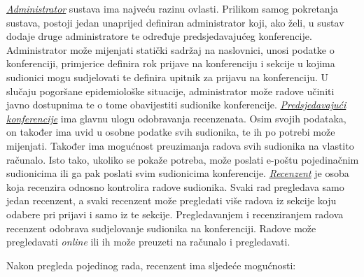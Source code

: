 		\underline{\textit{Administrator}} sustava ima najveću razinu ovlasti. Prilikom samog pokretanja sustava, postoji jedan unaprijed definiran administrator koji, ako želi, u sustav dodaje druge administratore te određuje predsjedavajućeg konferencije. Administrator može mijenjati statički sadržaj na naslovnici, unosi podatke o konferenciji, primjerice definira rok prijave na konferenciju i sekcije u kojima sudionici mogu sudjelovati te definira upitnik za prijavu na konferenciju. U slučaju pogoršane epidemiološke situacije, administrator može radove učiniti javno dostupnima te o tome obavijestiti sudionike konferencije.
		\newline
		\newline
		\indent \underline{\textit{Predsjedavajući konferencije}} ima glavnu ulogu odobravanja recenzenata. Osim svojih podataka, on također ima uvid u osobne podatke svih sudionika, te ih po potrebi može mijenjati. Također ima mogućnost preuzimanja radova svih sudionika na vlastito računalo. Isto tako, ukoliko se pokaže potreba, može poslati e-poštu pojedinačnim sudionicima ili ga pak poslati svim sudionicima konferencije. 
		\newline
		\newline
		\indent \underline{\textit{Recenzent}} je osoba koja recenzira odnosno kontrolira radove sudionika. Svaki rad pregledava samo jedan recenzent, a svaki recenzent može pregledati više radova iz sekcije koju odabere pri prijavi i samo iz te sekcije. Pregledavanjem i recenziranjem radova recenzent odobrava sudjelovanje sudionika na konferenciji. Radove može pregledavati \textit{online} ili ih može preuzeti na računalo i pregledavati. 
		
		Nakon pregleda pojedinog rada, recenzent ima sljedeće mogućnosti:
		
